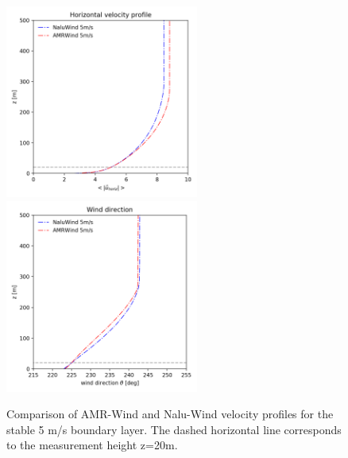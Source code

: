 \begin{figure} %
  \centering
  \includegraphics[width=2.5in]{figures/Compare_AMRWind_NaluWind/AMRWind_NaluWind_stable_05ms_mesh2p5_2p5_2p5_WS.png}
  \includegraphics[width=2.5in]{figures/Compare_AMRWind_NaluWind/AMRWind_NaluWind_stable_05ms_mesh2p5_2p5_2p5_Wdir.png}\\
  \caption{\label{fig:CompareAMRvsNaluWind_WSDir} Comparison of
    AMR-Wind and Nalu-Wind velocity profiles for the stable 5 m/s
    boundary layer. The dashed horizontal line corresponds to the
    measurement height z=20m. }
\end{figure}

